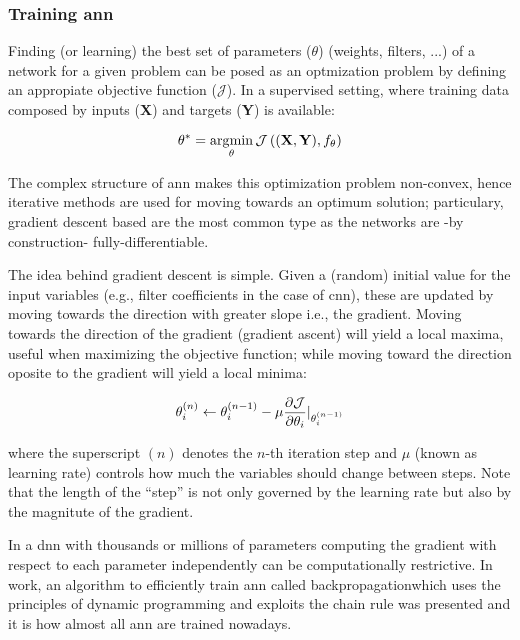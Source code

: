 \documentclass[../main.tex]{subfiles}
\begin{document}
\subsubsection{Training \gls{ann}}
Finding (or learning) the best set of parameters ($\theta$) (weights, filters,
...) of a network for a given problem can be posed as an optmization problem by
defining an appropiate objective function ($\mathcal{J}$).
In a supervised setting, where training data composed by
inputs (\textbf{X}) and targets (\textbf{Y}) is available:

\begin{equation}
\theta^* = \operatorname*{arg\!\min}_{\theta} \mathcal{J}
\left( (\mathbf{X}, \mathbf{Y}), f_{\theta} \right)
\end{equation}

The complex structure of \gls{ann} makes this optimization problem non-convex,
hence iterative methods are used for moving towards an optimum solution;
particulary, gradient descent based are the most common type as the networks
are -by construction- fully-differentiable.

The idea behind gradient descent is simple. Given a (random) initial value
for the input variables (e.g., filter coefficients in the case of \gls{cnn}),
these are updated by moving towards the direction with greater slope
i.e., the gradient. Moving towards the direction of the gradient (gradient
ascent) will yield a local maxima, useful when maximizing the objective
function; while moving toward the direction oposite to the gradient will
yield a local minima:

\begin{equation}\label{eq:gradient-descent}
\theta_i^{(n)} \leftarrow \theta_i^{(n - 1)}
- \mu \frac{\partial \mathcal{J}}{\partial \theta_i}
\rvert_{\theta_i^{(n - 1)}}
\end{equation}

where the superscript $(n)$ denotes the $n$-th iteration step and $\mu$
(known as learning rate) controls how much the variables should change between
steps. Note that the length of the ``step'' is not only governed by the
learning rate but also by the magnitute of the gradient.

In a \gls{dnn} with thousands or millions of parameters computing the gradient
with respect to each parameter independently can be computationally restrictive.
In \cite{backprop} work, an algorithm to efficiently train \gls{ann}
called backpropagation\footnotemark  which uses the principles of dynamic
programming and exploits the chain rule was presented and it is how almost
all \gls{ann} are trained nowadays.
\end{document}

